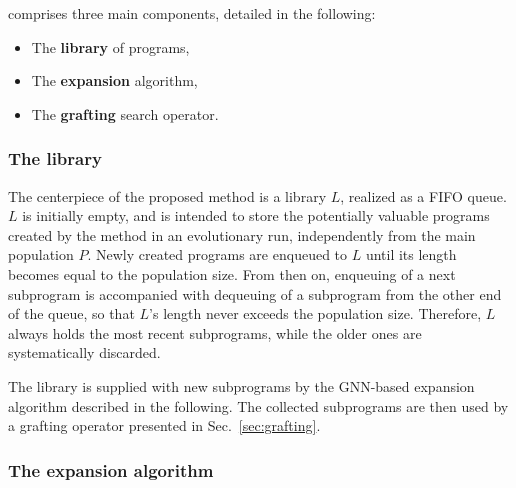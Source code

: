 \mname comprises three main components, detailed in the following:
\begin{itemize}
    \item The \textbf{library} of programs,
    \item The \textbf{expansion} algorithm,
    \item The \textbf{grafting} search operator.
\end{itemize}

\subsubsection{The library}\label{sec:library}

The centerpiece of the proposed method is a library $L$, realized as a FIFO queue. $L$ is initially empty, and is intended to store the potentially valuable programs created by the method in an evolutionary run, independently from the main population $P$. Newly created programs are enqueued to $L$ until its length becomes equal to the population size. From then on, enqueuing of a next subprogram is accompanied with dequeuing of a subprogram from the other end of the queue, so that $L$'s length never exceeds the population size. Therefore, $L$ always holds the most recent subprograms, while the older ones are systematically discarded. 

The library is supplied with new subprograms by the GNN-based expansion algorithm described in the following. The collected subprograms are then used by a grafting operator presented in Sec.~\ref{sec:grafting}.  


\subsubsection{The expansion algorithm}\label{sec:expander}

